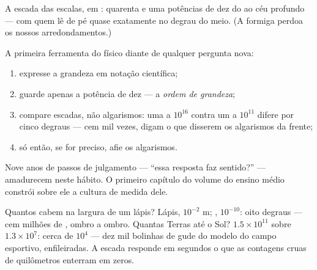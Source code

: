 \begin{omfigure}

{\small A escada das escalas, em : quarenta e uma potências de
dez do  ao céu profundo --- com quem lê de pé quase exatamente
no degrau do meio. (A formiga perdoa os nossos arredondamentos.)}
\end{omfigure}

\begin{method}\label{met:g9:atoms-to-galaxies:oom}
A primeira ferramenta do físico diante de qualquer pergunta nova:
\begin{enumerate}
  \item expresse a grandeza em notação científica;
  \item guarde apenas a potência de dez --- a \emph{ordem de
        grandeza};
  \item compare escadas, não algarismos: uma  a $10^{16}$
         contra um  a $10^{11}$ difere por cinco
        degraus --- cem mil vezes, digam o que disserem os
        algarismos da frente;
  \item só então, se for preciso, afie os algarismos.
\end{enumerate}
Nove anos de passos de julgamento --- ``essa resposta faz sentido?''
--- amadurecem neste hábito. O primeiro capítulo do volume do ensino
médio constrói sobre ele a cultura de medida dele.
\end{method}

\begin{example}\label{ex:g9:atoms-to-galaxies:arithmetic}
Quantos  cabem na largura de um lápis? Lápis, $10^{-2}$
\unit{m}; , $10^{-10}$: oito degraus --- cem milhões de ,
ombro a ombro. Quantas Terras até o Sol? $1.5 \times 10^{11}$ sobre
$1.3 \times 10^{7}$: cerca de $10^{4}$ --- dez mil bolinhas de gude
do modelo do campo esportivo, enfileiradas. A escada responde em
segundos o que as contagens cruas de quilômetros enterram em zeros.
\end{example}

